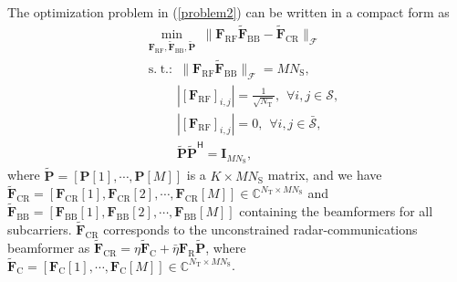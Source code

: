 \documentclass[journal,10pt]{IEEEtran}
\DeclareMathOperator*{\subjectto}{s.\hspace{3pt} t.:\hspace{3pt}} %
\begin{document}
{		The optimization problem in (\ref{problem2})  can be written in a compact form as
		\begin{subequations}
			\label{problem2OFDM}
			\begin{align}
			&\min_{\mathbf{F}_\mathrm{RF},\widetilde{\mathbf{F}}_\mathrm{BB},\widetilde{\mathbf{P}}} \hspace{3pt} \|\mathbf{F}_\mathrm{RF}\widetilde{\mathbf{F}}_\mathrm{BB} -\widetilde{\mathbf{F}}_\mathrm{CR} \|_\mathcal{F}  \nonumber \\
			&\subjectto \hspace{0pt} \| \mathbf{F}_\mathrm{RF}\widetilde{\mathbf{F}}_\mathrm{BB} \|_\mathcal{F} = MN_\mathrm{S},  \\
			&\hspace{30pt} |[\mathbf{F}_\mathrm{RF}]_{i,j}| = \frac{1}{\sqrt{N_\mathrm{T}}}, \hspace{5pt} \forall i,j\in \mathcal{S},   \label{FrfzeroConstraint1} \\
			&\hspace{30pt} |[\mathbf{F}_\mathrm{RF}]_{i,j}| = 0, \hspace{5pt} \forall i,j\in \bar{\mathcal{S}}, \label{FrfzeroConstraint2} \\
			& \hspace{30pt}\widetilde{\mathbf{P}}\widetilde{\mathbf{P}}^\textsf{H} = \mathbf{I}_{MN_\mathrm{S}},
			\end{align}
		\end{subequations}
		where $\widetilde{\mathbf{P}} = [\mathbf{P}[1],\cdots, \mathbf{P}[M]] $ is a $K\times MN_\mathrm{S}$ matrix, and we have  $	\widetilde{\mathbf{F}}_\mathrm{CR} = [ \mathbf{F}_\mathrm{CR}[1],
		\mathbf{F}_\mathrm{CR}[2], \cdots, \mathbf{F}_\mathrm{CR}[M] ]\in \mathbb{C}^{N_\mathrm{T}\times MN_\mathrm{S}}$
		and $	\widetilde{\mathbf{F}}_\mathrm{BB} = [ \mathbf{{F}}_\mathrm{BB}[1],  \mathbf{{F}}_\mathrm{BB}[2],  \cdots,  \mathbf{{F}}_\mathrm{BB}[M] ]$
		containing the beamformers for all subcarriers. $ \widetilde{\mathbf{F}}_\mathrm{CR}$ corresponds to the unconstrained radar-communications beamformer as $ \widetilde{\mathbf{F}}_\mathrm{CR} = \eta\widetilde{\mathbf{F}}_\mathrm{C}  + \bar{\eta} \mathbf{F}_\mathrm{R}\widetilde{\mathbf{P}}$, where $\widetilde{\mathbf{F}}_\mathrm{C} = [\mathbf{F}_\mathrm{C}[1],\cdots, \mathbf{F}_\mathrm{C}[M]]\in \mathbb{C}^{N_\mathrm{T}\times MN_\mathrm{S}}$.
		
		
		
		
		
}
\end{document}
